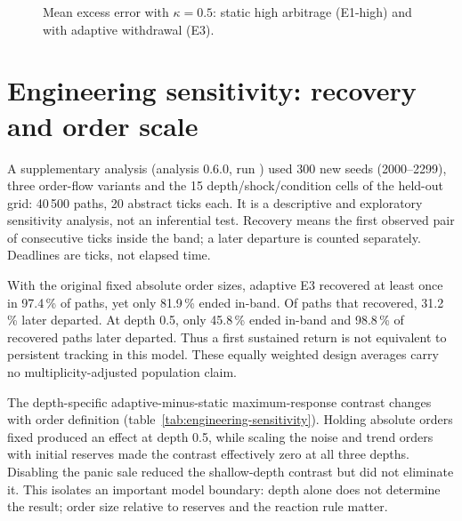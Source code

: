 \begin{figure}[htbp]
\centering
{}
\caption{Mean excess error with $\kappa=0.5$: static high arbitrage (E1-high) and with adaptive withdrawal (E3).}
\label{fig:prof}
\end{figure}

\section{Engineering sensitivity: recovery and order scale}
\label{sec:engineering-sensitivity}

A supplementary analysis (analysis 0.6.0, run \code{\EngineeringRunID}) used 300 new seeds (2000--2299), three order-flow variants and the 15 depth/shock/condition cells of the held-out grid: 40\,500 paths, 20 abstract ticks each. It is a descriptive and exploratory sensitivity analysis, not an inferential test. Recovery means the first observed pair of consecutive ticks inside the band; a later departure is counted separately. Deadlines are ticks, not elapsed time.

With the original fixed absolute order sizes, adaptive E3 recovered at least once in 97.4\,\% of paths, yet only 81.9\,\% ended in-band. Of paths that recovered, 31.2\,\% later departed. At depth 0.5, only 45.8\,\% ended in-band and 98.8\,\% of recovered paths later departed. Thus a first sustained return is not equivalent to persistent tracking in this model. These equally weighted design averages carry no multiplicity-adjusted population claim.

The depth-specific adaptive-minus-static maximum-response contrast changes with order definition (table~\ref{tab:engineering-sensitivity}). Holding absolute orders fixed produced an effect at depth 0.5, while scaling the noise and trend orders with initial reserves made the contrast effectively zero at all three depths. Disabling the panic sale reduced the shallow-depth contrast but did not eliminate it. This isolates an important model boundary: depth alone does not determine the result; order size relative to reserves and the reaction rule matter.

